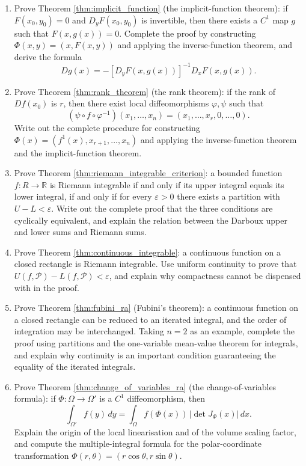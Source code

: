 \begin{enumerate}[leftmargin=3em, label=\textbf{Exercise \arabic*}]
    \item Prove Theorem \ref{thm:implicit_function} (the implicit-function theorem):
    if $F(x_0,y_0)=0$ and $D_yF(x_0,y_0)$ is invertible,
    then there exists a $C^1$ map $g$ such that $F(x,g(x))=0$.
    Complete the proof by constructing $\Phi(x,y)=(x,F(x,y))$ and applying the inverse-function theorem,
    and derive the formula
    \[
    Dg(x)=-[D_yF(x,g(x))]^{-1}D_xF(x,g(x)).
    \]

    \item Prove Theorem \ref{thm:rank_theorem} (the rank theorem):
    if the rank of $Df(x_0)$ is $r$, then there exist local diffeomorphisms $\varphi,\psi$ such that
    \[
    (\psi\circ f\circ\varphi^{-1})(x_1,\dots,x_n)
    =(x_1,\dots,x_r,0,\dots,0).
    \]
    Write out the complete procedure for constructing $\Phi(x)=(f^1(x),x_{r+1},\dots,x_n)$
    and applying the inverse-function theorem and the implicit-function theorem.

    \item Prove Theorem \ref{thm:riemann_integrable_criterion}:
    a bounded function $f:R\to\mathbb{R}$ is Riemann integrable
    if and only if its upper integral equals its lower integral,
    if and only if for every $\varepsilon>0$ there exists a partition with $U-L<\varepsilon$.
    Write out the complete proof that the three conditions are cyclically equivalent,
    and explain the relation between the Darboux upper and lower sums and Riemann sums.

    \item Prove Theorem \ref{thm:continuous_integrable}:
    a continuous function on a closed rectangle is Riemann integrable.
    Use uniform continuity to prove that $U(f,\mathcal{P})-L(f,\mathcal{P})<\varepsilon$,
    and explain why compactness cannot be dispensed with in the proof.

    \item Prove Theorem \ref{thm:fubini_ra} (Fubini's theorem):
    a continuous function on a closed rectangle can be reduced to an iterated integral, and the order of integration may be interchanged.
    Taking $n=2$ as an example, complete the proof using partitions and the one-variable mean-value theorem for integrals,
    and explain why continuity is an important condition guaranteeing the equality of the iterated integrals.

    \item Prove Theorem \ref{thm:change_of_variables_ra} (the change-of-variables formula):
    if $\Phi:\Omega\to\Omega'$ is a $C^1$ diffeomorphism, then
    \[
    \int_{\Omega'}f(y)\,dy
    =
    \int_{\Omega}f(\Phi(x))\,|\det J_\Phi(x)|\,dx.
    \]
    Explain the origin of the local linearisation and of the volume scaling factor,
    and compute the multiple-integral formula for the polar-coordinate transformation
    $\Phi(r,\theta)=(r\cos\theta,r\sin\theta)$.


\end{enumerate}
